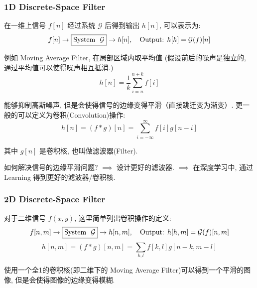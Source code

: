 \subsubsection{1D Discrete-Space Filter} 
在一维上信号 $f[n]$ 经过系统 $\mathcal{G}$ 后得到输出 $h[n]$, 可以表示为:
\[
    f[n] \to \fbox{\text{System } $\mathcal{G}$} \to h[n], \quad \text{Output: } h[h] = \mathcal{G}(f)[n]
\]

例如 Moving Average Filter, 在局部区域内取平均值 (假设前后的噪声是独立的, 通过平均值可以使得噪声相互抵消.)
\[
    h[n] = \frac{1}{k} \sum_{i = n}^{n + k} f[i]
\]

能够抑制高斯噪声, 但是会使得信号的边缘变得平滑（直接跳迁变为渐变）. 更一般的可以定义为卷积(Convolution)操作:
\[
    h[n] = (f * g)[n] = \sum_{i = -\infty}^{\infty} f[i] g[n - i]
\] 

其中 $g[n]$ 是卷积核, 也叫做滤波器(Filter). 

如何解决信号的边缘平滑问题? $\implies$ 设计更好的滤波器. $\implies$ 在深度学习中, 通过 Learning 得到更好的滤波器/卷积核.

\subsubsection{2D Discrete-Space Filter}
对于二维信号 $f(x, y)$, 这里简单列出卷积操作的定义:
\begin{equation*}
    f[n, m] \to \fbox{\text{System } $\mathcal{G}$} \to h[n, m], \quad \text{Output: } h[h, m] = \mathcal{G}(f)[n, m]
\end{equation*}
\begin{equation*}
    h[n, m] = (f * g)[n, m] = \sum_{k, l} f[k, l] g[n - k, m - l]
\end{equation*}

使用一个全1的卷积核(即二维下的 Moving Average Filter)可以得到一个平滑的图像, 但是会使得图像的边缘变得模糊. 

